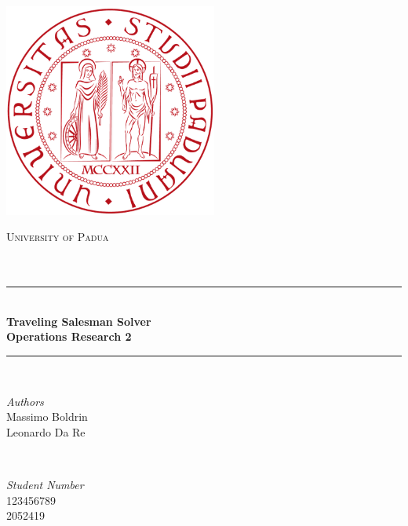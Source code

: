 \documentclass[a4paper]{report}
\begin{document}
\begin{titlepage} %
	\newcommand{\HRule}{\rule{\linewidth}{0.5mm}} %
	
	\center %
	
	\includegraphics[width=7cm]{unipd_logo.png}
	\bigskip
	
	\bigskip
	\textsc{\LARGE University of Padua}\\[1.5cm] %
	
	\textsc{\Large }\\[0.5cm] %
	
	\textsc{\large }\\[0.5cm] %
	
	
	\HRule\\[0.4cm]
	
	{\huge\bfseries Traveling Salesman Solver \\ Operations Research 2}\\[0.4cm] %
	
	\HRule\\[1.5cm]
	
	
	\begin{minipage}{0.4\textwidth}
		\begin{flushleft}
			\large
			\textit{Authors}\\
			Massimo Boldrin \\
            Leonardo Da Re
		\end{flushleft}
	\end{minipage}
	~
	\begin{minipage}{0.4\textwidth}
		\begin{flushright}
			\large
			\textit{Student Number}\\
			123456789 \\
            2052419
		\end{flushright}
	\end{minipage}
	

\end{titlepage}
\end{document}
